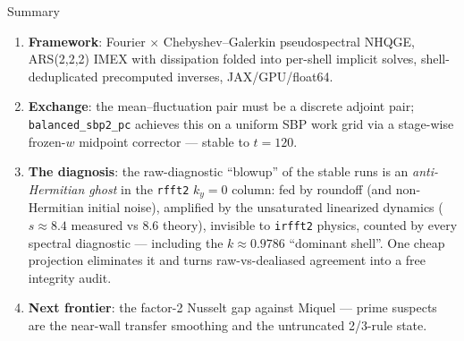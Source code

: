 \documentclass[aspectratio=169,10pt]{beamer}
\begin{document}
\begin{frame}{Summary}
  \begin{enumerate}
    \item \textbf{Framework}: Fourier $\times$ Chebyshev--Galerkin pseudospectral
      NHQGE, ARS(2,2,2) IMEX with dissipation folded into per-shell implicit solves,
      shell-deduplicated precomputed inverses, JAX/GPU/float64.
    \item \textbf{Exchange}: the mean--fluctuation pair must be a discrete adjoint
      pair; \texttt{balanced\_sbp2\_pc} achieves this on a uniform SBP work grid via
      a stage-wise frozen-$w$ midpoint corrector --- stable to $t=120$.
    \item \textbf{The diagnosis}: the raw-diagnostic ``blowup'' of the stable runs is
      an \emph{anti-Hermitian ghost} in the \texttt{rfft2} $k_y{=}0$ column:
      fed by roundoff (and non-Hermitian initial noise), amplified by the
      unsaturated linearized dynamics ($s\approx8.4$ measured vs $8.6$ theory),
      invisible to \texttt{irfft2} physics, counted by every spectral diagnostic ---
      including the $k\approx0.9786$ ``dominant shell''. One cheap projection
      eliminates it and turns raw-vs-dealiased agreement into a free integrity audit.
    \item \textbf{Next frontier}: the factor-2 Nusselt gap against Miquel ---
      prime suspects are the near-wall transfer smoothing and the untruncated
      2/3-rule state.
  \end{enumerate}
\end{frame}
\end{document}

